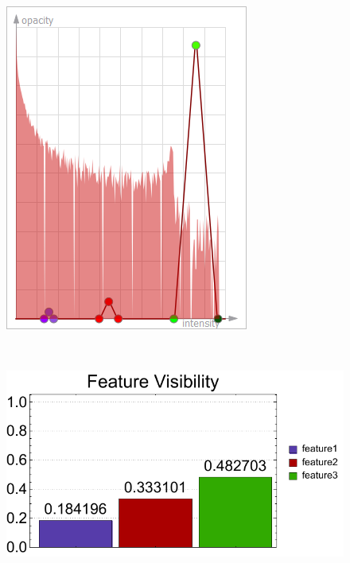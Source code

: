 \begin{figure}
\begin{minipage}{.15\textwidth}
		\includegraphics[width=1\linewidth]{figures/tf_nucleon_naive_proportional_optimized_linesearch}
		\subcaption{}
	\end{minipage}~
	\begin{minipage}{.3\textwidth}
		\includegraphics[width=1\linewidth]{figures/nucleon_naive_proportional_optimized_linesearch_visibility_chart}

\end{minipage}
\end{figure}
